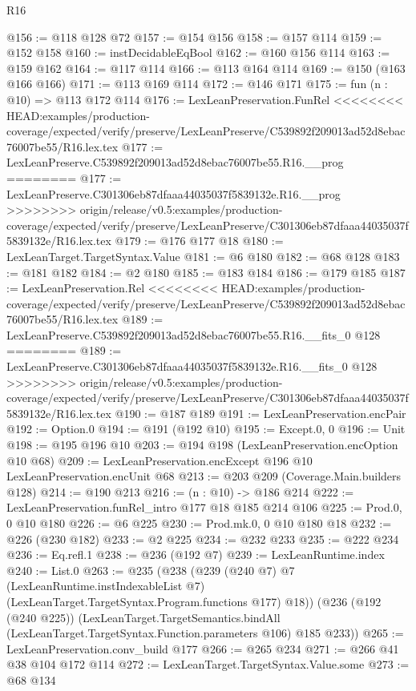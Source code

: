 \begin{lexlean}{R16}
\begin{coremodule}
{{{{{@156 := @118 @128 @72
@157 := @154 @156
@158 := @157 @114
@159 := @152 @158
@160 := instDecidableEqBool
@162 := @160 @156 @114
@163 := @159 @162
@164 := @117 @114
@166 := @113 @164 @114
@169 := @150 (@163 @166 @166)
@171 := @113 @169 @114
@172 := @146 @171
@175 := fun (n : @10) => @113 @172 @114
@176 := LexLeanPreservation.FunRel
<<<<<<<< HEAD:examples/production-coverage/expected/verify/preserve/LexLeanPreserve/C539892f209013ad52d8ebac76007be55/R16.lex.tex
@177 := LexLeanPreserve.C539892f209013ad52d8ebac76007be55.R16.__prog
========
@177 := LexLeanPreserve.C301306eb87dfaaa44035037f5839132e.R16.__prog
>>>>>>>> origin/release/v0.5:examples/production-coverage/expected/verify/preserve/LexLeanPreserve/C301306eb87dfaaa44035037f5839132e/R16.lex.tex
@179 := @176 @177 @18
@180 := LexLeanTarget.TargetSyntax.Value
@181 := @6 @180
@182 := @68 @128
@183 := @181 @182
@184 := @2 @180
@185 := @183 @184
@186 := @179 @185
@187 := LexLeanPreservation.Rel
<<<<<<<< HEAD:examples/production-coverage/expected/verify/preserve/LexLeanPreserve/C539892f209013ad52d8ebac76007be55/R16.lex.tex
@189 := LexLeanPreserve.C539892f209013ad52d8ebac76007be55.R16.__fits_0 @128
========
@189 := LexLeanPreserve.C301306eb87dfaaa44035037f5839132e.R16.__fits_0 @128
>>>>>>>> origin/release/v0.5:examples/production-coverage/expected/verify/preserve/LexLeanPreserve/C301306eb87dfaaa44035037f5839132e/R16.lex.tex
@190 := @187 @189
@191 := LexLeanPreservation.encPair
@192 := Option.{0}
@194 := @191 (@192 @10)
@195 := Except.{0, 0}
@196 := Unit
@198 := @195 @196 @10
@203 := @194 @198 (LexLeanPreservation.encOption @10 @68)
@209 := LexLeanPreservation.encExcept @196 @10 LexLeanPreservation.encUnit @68
@213 := @203 @209 (Coverage.Main.builders @128)
@214 := @190 @213
@216 := (n : @10) -> @186 @214
@222 := LexLeanPreservation.funRel_intro @177 @18 @185 @214 @106
@225 := Prod.{0, 0} @10 @180
@226 := @6 @225
@230 := Prod.mk.{0, 0} @10 @180 @18
@232 := @226 (@230 @182)
@233 := @2 @225
@234 := @232 @233
@235 := @222 @234
@236 := Eq.refl.{1}
@238 := @236 (@192 @7)
@239 := LexLeanRuntime.index
@240 := List.{0}
@263 := @235
    (@238
      (@239
        (@240 @7)
        @7
        (LexLeanRuntime.instIndexableList @7)
        (LexLeanTarget.TargetSyntax.Program.functions @177)
        @18))
    (@236
      (@192 (@240 @225))
      (LexLeanTarget.TargetSemantics.bindAll
        (LexLeanTarget.TargetSyntax.Function.parameters @106)
        @185
        @233))
@265 := LexLeanPreservation.conv_build @177
@266 := @265 @234
@271 := @266 @41 @38 @104 @172 @114
@272 := LexLeanTarget.TargetSyntax.Value.some
@273 := @68 @134
}}}}}
\end{coremodule}
\end{lexlean}

